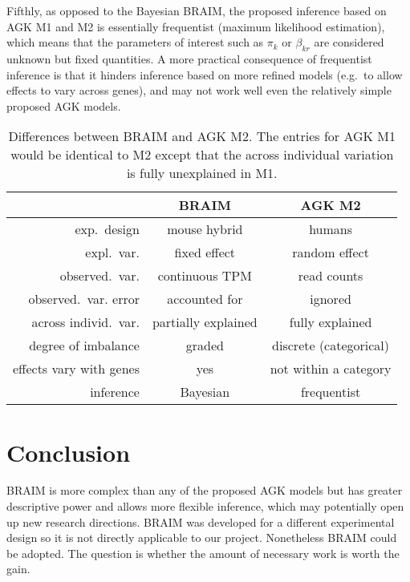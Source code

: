 \documentclass[letterpaper]{article}
\begin{document}
Fifthly, as opposed to the Bayesian BRAIM, the proposed inference based on AGK
M1 and M2 is essentially frequentist (maximum likelihood estimation), which
means that the parameters of interest such as \(\pi_k\) or \(\beta_{kr}\) are
considered unknown but fixed quantities.  A more practical consequence of
frequentist inference is that it hinders inference based on more refined models (e.g.~to allow
effects to vary across genes), and may not work well even the relatively
simple proposed AGK models.

\begin{table}
\begin{tabular}{r|cc|}
 & BRAIM & AGK M2 \\
 \hline
exp.~design & mouse hybrid & humans \\
expl.~var. & fixed effect & random effect \\
observed.~var. & continuous TPM & read counts \\
observed.~var. error & accounted for & ignored \\
across individ.~var. & partially explained & fully explained \\
degree of imbalance & graded & discrete (categorical) \\
effects vary with genes & yes & not within a category \\
inference & Bayesian & frequentist \\
\hline
\end{tabular}
\caption{Differences between BRAIM and AGK M2.  The entries for AGK M1 would be identical to M2
    except that the across individual variation is fully unexplained in M1.}
\label{tab:differences}
\end{table}

\section{Conclusion}

BRAIM is more complex than any of the proposed AGK models but has greater
descriptive power and allows more flexible inference, which may potentially
open up new research directions.  BRAIM was developed for
a different experimental design so it is not directly applicable to our
project.  Nonetheless BRAIM could be adopted.  The question is whether the
amount of necessary work is worth the gain.


\end{document}
